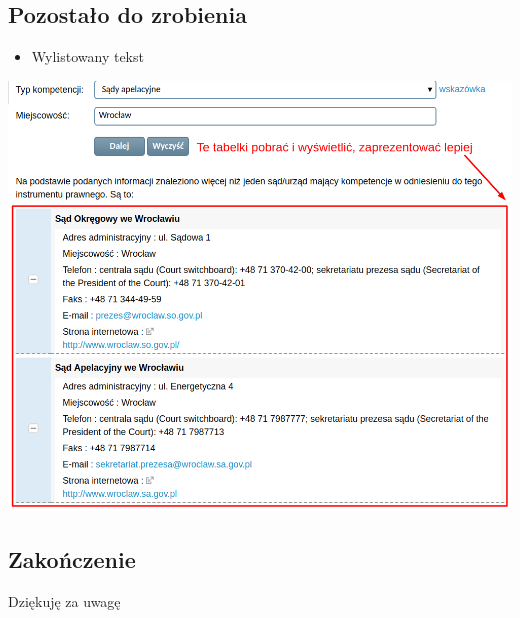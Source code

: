 \documentclass[slidestop,red]{beamer}
\begin{document}
\subsection{Pozostało do zrobienia}
\frame
{
	\begin{block}{}
		\begin{itemize}
                    \item Wylistowany tekst
                \end{itemize}
                \includegraphics[scale=0.22]{to-wyswietlic.png}
        \end{block}
}

\subsection{Zakończenie}
\frame
{
\begin{center}
\begin{block}{}
        \centering Dziękuję za uwagę
\end{block}
\end{center}
}
\end{document}

